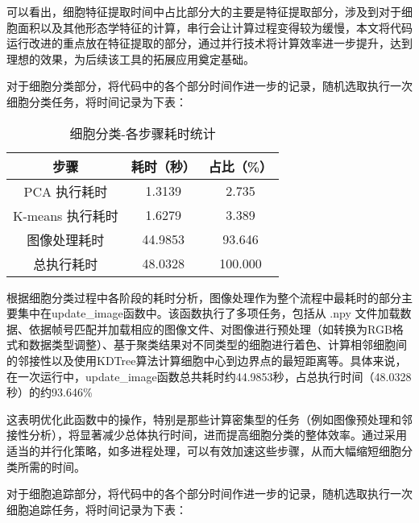可以看出，细胞特征提取时间中占比部分大的主要是特征提取部分，涉及到对于细胞面积以及其他形态学特征的计算，串行会让计算过程变得较为缓慢，本文将代码运行改进的重点放在特征提取的部分，通过并行技术将计算效率进一步提升，达到理想的效果，为后续该工具的拓展应用奠定基础。

对于细胞分类部分，将代码中的各个部分时间作进一步的记录，随机选取执行一次细胞分类任务，将时间记录为下表：

\begin{table}[!htbp]
    \centering
    \caption{细胞分类-各步骤耗时统计}
    \begin{tabular*}{300pt}{@{\extracolsep{\fill}}ccc}
        \toprule
        步骤               & 耗时（秒） & 占比（\%） \\
        \midrule
        PCA 执行耗时       & 1.3139     & 2.735      \\
        K-means 执行耗时   & 1.6279     & 3.389      \\
        图像处理耗时       & 44.9853    & 93.646     \\
        总执行耗时         & 48.0328    & 100.000    \\
        \bottomrule
    \end{tabular*}
\end{table}
根据细胞分类过程中各阶段的耗时分析，图像处理作为整个流程中最耗时的部分主要集中在update\_image函数中。该函数执行了多项任务，包括从 .npy 文件加载数据、依据帧号匹配并加载相应的图像文件、对图像进行预处理（如转换为RGB格式和数据类型调整）、基于聚类结果对不同类型的细胞进行着色、计算相邻细胞间的邻接性以及使用KDTree算法计算细胞中心到边界点的最短距离等。具体来说，在一次运行中，update\_image函数总共耗时约44.9853秒，占总执行时间（48.0328秒）的约93.646\%

这表明优化此函数中的操作，特别是那些计算密集型的任务（例如图像预处理和邻接性分析），将显著减少总体执行时间，进而提高细胞分类的整体效率。通过采用适当的并行化策略，如多进程处理，可以有效加速这些步骤，从而大幅缩短细胞分类所需的时间。

对于细胞追踪部分，将代码中的各个部分时间作进一步的记录，随机选取执行一次细胞追踪任务，将时间记录为下表：

